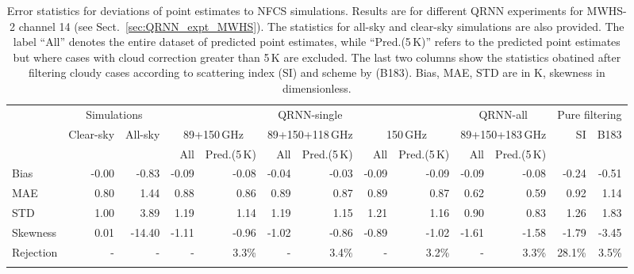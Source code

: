 \documentclass[amt, manuscript]{copernicus}
\begin{document}
\begin{table}[t]
	\caption{Error statistics for deviations of point estimates to NFCS simulations. Results are for different QRNN experiments for MWHS-2 channel 14 (see Sect.~\ref{sec:QRNN_expt_MWHS}). The statistics for all-sky and clear-sky simulations are also provided. The label ``All'' denotes the entire dataset of predicted point estimates, while ``Pred.(5\,K)'' refers to the predicted point estimates but where cases with cloud correction greater than 5\,K are excluded. The last two columns show the statistics obatined after filtering cloudy cases according to scattering index (SI) and scheme by \citet{buehler:aclou:07} (B183). Bias, MAE, STD are in K, skewness in dimensionless.}
	\label{tab:error_statistics_mwhs_14}
	\setlength{\tabcolsep}{4pt}
	\begin{tabular}{lrr|rr|rr|rr|rr|rr}
		\tophline
		&\multicolumn{2}{c|}{Simulations}& \multicolumn{6}{c|}{QRNN-single} & \multicolumn{2}{c|}{QRNN-all} & \multicolumn{2}{c}{Pure filtering}\\
		\cline{2-13}
		&   Clear-sky &   All-sky &  \multicolumn{2}{c|}{89+150\,GHz} & \multicolumn{2}{c|}{89+150+118\,GHz} & \multicolumn{2}{c|}{150\,GHz} & \multicolumn{2}{c|}{89+150+183\,GHz}& SI & B183\\		
		&			   &			& All & Pred.(5\,K) & All & Pred.(5\,K) & All & Pred.(5\,K)  & All & Pred.(5\,K)&&\\
		\middlehline
Bias     & -0.00 &  -0.83 & -0.09 & -0.08 & -0.04 & -0.03 & -0.09 & -0.09 & -0.09 & -0.08 & -0.24 & -0.51\\
MAE      &  0.80 &   1.44 &  0.88 &  0.86 &  0.89 &  0.87 &  0.89 &  0.87 &  0.62 &  0.59 &  0.92 &  1.14\\
STD      &  1.00 &   3.89 &  1.19 &  1.14 &  1.19 &  1.15 &  1.21 &  1.16 &  0.90 &  0.83 &  1.26 &  1.83\\
Skewness &  0.01 & -14.40 & -1.11 & -0.96 & -1.02 & -0.86 & -0.89 & -1.02 & -1.61 & -1.58 & -1.79 & -3.45\\
Rejection&  -	 & - 	  & - 	  & 3.3\% & - 	  & 3.4\% & -     & 3.2\% & -     & 3.3\% & 28.1\%& 3.5\%\\
\bottomhline
	\end{tabular}
\end{table}
\end{document}

